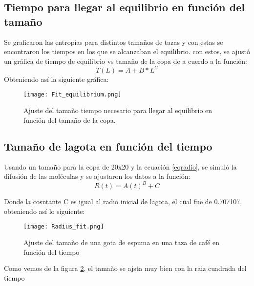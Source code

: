 \documentclass{article}
\begin{document}
\subsection{Tiempo para llegar al equilibrio en función del tamaño}
Se graficaron las entropías para distintos tamaños de tazas y con estas se encontraron los tiempos en los que se alcanzaban el equilibrio. con estos, se ajustó un gráfica de tiempo de equilibrio vs tamaño de la copa de a cuerdo a la función:
\begin{equation}
    T(L)=A+B*L^{C}
\end{equation}
Obteniendo así la siguiente gráfica:
\begin{figure}[H]
   \centering
   \texttt{[image: Fit\_equilibrium.png]}
   \caption{Ajuste del tamaño tiempo necesario para llegar al equilibrio en función del tamaño de la copa.}
   \label{fig:eqtime}
 \end{figure}
 



\subsection{Tamaño de lagota en función del tiempo}
Usando un tamaño para la copa de 20x20 y la ecuación \ref{eqradio}, se simuló la difusión de las moléculas y se ajustaron los datos a la función:
\begin{equation}
    R(t)=A(t)^{B}+C
\end{equation}

Donde la cosntante C es igual al radio inicial de lagota, el cual fue de 0.707107, obteniendo así lo siguiente:
\begin{figure}[H]
   \centering
   \texttt{[image: Radius\_fit.png]}
   \caption{Ajuste del tamaño de una gota de espuma en una taza de café en función del tiempo}
   \label{fig:radius}
 \end{figure}
  Como vemos de la figura \ref{fig:radius}, el tamaño se ajsta muy bien con la raiz cuadrada del tiempo
  
  
\end{document}
